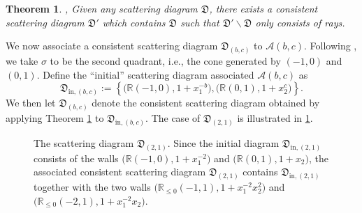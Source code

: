 \documentclass[11pt]{amsart}
\newtheorem{theorem}{Theorem}[section]
\theoremstyle{remark}
\newtheorem{example}[theorem]{Example}
\numberwithin{equation}{section}
\newcommand{\RR}{\mathbb{R}}
\newcommand{\cA}{\mathcal{A}}
\newcommand{\fD}{\mathfrak{D}}
\begin{document}
\begin{theorem}\cite{KS},\cite{GS}
  \label{th:KS}
  Given any scattering diagram $\fD$, there exists a consistent scattering
  diagram $\fD'$ which contains $\fD$ such that $\fD'\smallsetminus\fD$ only consists
  of rays.
\end{theorem}

We now associate a consistent scattering diagram $\fD_{(b,c)}$ to 
$\cA(b,c)$.  Following \cite[Example~1.30]{GHKK}, we take $\sigma$ to be the second quadrant, i.e., the cone generated by $(-1,0)$ and
$(0,1)$. Define the ``initial'' scattering diagram associated $\cA(b,c)$ as
\[
  \fD_{\mathrm{in},(b,c)} := 
  \left\{
    \big( \RR (-1,0), 1+x_1^{-b}\big), 
    \big( \RR (0,1), 1+x_2^c\big) 
  \right\}.
\]
We then let $\fD_{(b,c)}$ denote the consistent scattering diagram obtained by
applying Theorem \ref{th:KS} to $\fD_{\mathrm{in},(b,c)}$.  The case of $\fD_{(2,1)}$ is illustrated in \cref{fig:diagex}.


\begin{figure}
  \centering
  \caption{The scattering diagram $\fD_{(2,1)}$.  Since the initial diagram $\fD_{\mathrm{in},(2,1)}$ consists of the walls $\big(\RR(-1,0),\allowbreak 1+x_1^{-2}\big)$ and $\big(\RR (0,1), 1+x_2\big)$,
  the associated consistent scattering diagram $\fD_{(2,1)}$ contains $\fD_{\mathrm{in},(2,1)}$ together with
  the two walls $\big(\RR_{\leq 0} (-1,1), 1+x_1^{-2}x_2^2 \big)$ and $\big( \RR_{\leq 0} (-2,1), 1+x_1^{-2}x_2 \big)$.
} 
  \label{fig:diagex}
\end{figure}
\end{document}
